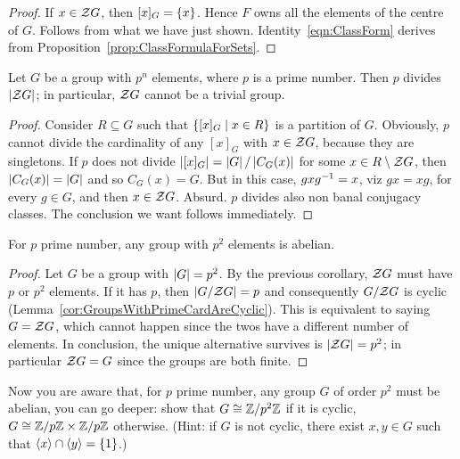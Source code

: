 \begin{proof}
If \(x \in \mathcal Z G\), then \([x]_G = \left\{x\right\}\). Hence \(F\) owns all the elements of the centre of \(G\). Follows from what we have just shown. Identity~\eqref{eqn:ClassForm} derives from Proposition~\ref{prop:ClassFormulaForSets}.
\end{proof}

\begin{corollary}
Let \(G\) be a group with \(p^n\) elements, where \(p\) is a prime number. Then \(p\) divides \(\left\lvert\mathcal Z G\right\rvert\); in particular, \(\mathcal Z G\) cannot be a trivial group.
\end{corollary}

\begin{proof}
Consider \(R \subseteq G\) such that \(\left\{[x]_G \mid x \in R\right\}\) is a partition of \(G\). Obviously, \(p\) cannot divide the cardinality of any \([x]_G\) with \(x \in \mathcal Z G\), because they are singletons. If \(p\) does not divide \(\left\lvert[x]_G\right\rvert = \left\lvert G\right\rvert / \left\lvert C_G(x)\right\rvert\) for some \(x \in R \setminus \mathcal Z G\), then \(\left\lvert C_G (x)\right\rvert = \left\lvert G\right\rvert\) and so \(C_G(x) = G\). But in this case, \(g x g^{-1} = x\), viz \(gx = xg\), for every \(g \in G\), and then \(x \in \mathcal Z G\). Absurd. \(p\) divides also non banal conjugacy classes. The conclusion we want follows immediately.
\end{proof}

\begin{corollary}
For \(p\) prime number, any group with \(p^2\) elements is abelian.
\end{corollary}

\begin{proof}
Let \(G\) be a group with \(\left\lvert G\right\rvert = p^2\). By the previous corollary, \(\mathcal Z G\) must have \(p\) or \(p^2\) elements. If it has \(p\), then \(\left\lvert G / \mathcal Z G\right\rvert = p\) and consequently \(G/\mathcal Z G\) is cyclic (Lemma~\ref{cor:GroupsWithPrimeCardAreCyclic}). This is equivalent to saying \(G = \mathcal Z G\), which cannot happen since the twos have a different number of elements. In conclusion, the unique alternative survives is \(\left\lvert\mathcal Z G\right\rvert = p^2\); in particular \(\mathcal Z G = G\) since the groups are both finite.
\end{proof}

\begin{exercise}
Now you are aware that, for \(p\) prime number, any group \(G\) of order \(p^2\) must be abelian, you can go deeper: show that \(G \cong \mathbb Z/p^2\mathbb Z\) if it is cyclic, \(G \cong \mathbb Z/p\mathbb Z \times \mathbb Z/p\mathbb Z\) otherwise. (Hint: if \(G\) is not cyclic, there exist \(x, y \in G\) such that \(\left\langle x\right\rangle \cap \left\langle y\right\rangle = \left\{1\right\}\).)
\end{exercise}
